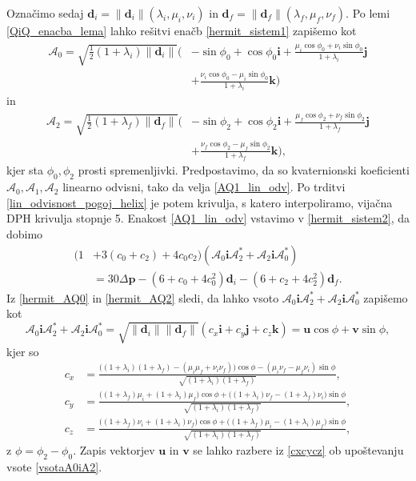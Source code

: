 \documentclass[12pt,a4paper,twoside]{article}
\theoremstyle{definition} %
\theoremstyle{plain} %
\theoremstyle{primerstyle}
\numberwithin{equation}{section}  %
\newcommand{\dV}{\mathbf{d}}
\newcommand{\pV}{\mathbf{p}}
\newcommand{\iV}{\mathbf{i}}
\newcommand{\jV}{\mathbf{j}}
\newcommand{\kV}{\mathbf{k}}
\newcommand{\uV}{\mathbf{u}}
\newcommand{\vV}{\mathbf{v}}
\newcommand{\AQ}{\mathcal{A}}
\begin{document}
Označimo sedaj $\dV_i=\lVert\dV_i\rVert(\lambda_i,\mu_i,\nu_i)$ in $\dV_f=\lVert\dV_f\rVert(\lambda_f,\mu_f,\nu_f).$ Po lemi \ref{QiQ_enacba_lema} lahko rešitvi enačb \eqref{hermit_sistem1} zapišemo kot
\begin{align}
	\label{hermit_AQ0}
	\AQ_0=\sqrt{\frac{1}{2}(1+\lambda_i)\lVert\dV_i\rVert}\Big(&-\sin\phi_0+\cos\phi_0\iV+\frac{\mu_i\cos\phi_0+\nu_i\sin\phi_0}{1+\lambda_i}\jV\nonumber\\
		&+\frac{\nu_i\cos\phi_0-\mu_i\sin\phi_0}{1+\lambda_i}\kV\Big)
\end{align}
in
\begin{align}
	\label{hermit_AQ2}
	\AQ_2=\sqrt{\frac{1}{2}(1+\lambda_f)\lVert\dV_f\rVert}\Big(&-\sin\phi_2+\cos\phi_2\iV+\frac{\mu_f\cos\phi_2+\nu_f\sin\phi_2}{1+\lambda_f}\jV\nonumber\\
		&+\frac{\nu_f\cos\phi_2-\mu_f\sin\phi_2}{1+\lambda_f}\kV\Big),
\end{align}
kjer sta $\phi_0,\phi_2$ prosti spremenljivki. Predpostavimo, da so kvaternionski koeficienti $\AQ_0,\AQ_1,\AQ_2$ linearno odvisni, tako da velja \eqref{AQ1_lin_odv}. Po trditvi \ref{lin_odvisnost_pogoj_helix} je potem krivulja, s katero interpoliramo, vijačna DPH krivulja stopnje 5. Enakost \eqref{AQ1_lin_odv} vstavimo v \eqref{hermit_sistem2}, da dobimo
\begin{align}
	\label{hermit_sistem3}
	(1&+3(c_0+c_2)+4c_0c_2)(\AQ_0\iV\AQ_2^*+\AQ_2\iV\AQ_0^*)\nonumber\\
	&=30\Delta\pV-(6+c_0+4c_0^2)\dV_i-(6+c_2+4c_2^2)\dV_f.
\end{align}
Iz \eqref{hermit_AQ0} in \eqref{hermit_AQ2} sledi, da lahko vsoto $\AQ_0\iV\AQ_2^*+\AQ_2\iV\AQ_0^*$ zapišemo kot
\begin{equation}
	\label{vsotaA0iA2}
	\AQ_0\iV\AQ_2^*+\AQ_2\iV\AQ_0^*=\sqrt{\lVert\dV_i\rVert\lVert\dV_f\rVert}(c_x\iV+c_y\jV+c_z\kV)=\uV\cos\phi+\vV\sin\phi,
\end{equation}
kjer so
\begin{align}
	\label{cxcycz}
	c_x&=\frac{\big((1+\lambda_i)(1+\lambda_f)-(\mu_i\mu_f+\nu_i\nu_f)\big)\cos\phi-(\mu_i\nu_f-\mu_f\nu_i)\sin\phi}{\sqrt{(1+\lambda_i)(1+\lambda_f)}},\nonumber\\
	c_y&=\frac{\big((1+\lambda_f)\mu_i+(1+\lambda_i)\mu_f\big)\cos\phi+\big((1+\lambda_i)\nu_f-(1+\lambda_f)\nu_i\big)\sin\phi}{\sqrt{(1+\lambda_i)(1+\lambda_f)}},\\
	c_z&=\frac{\big((1+\lambda_f)\nu_i+(1+\lambda_i)\nu_f\big)\cos\phi+\big((1+\lambda_f)\mu_i-(1+\lambda_i)\mu_f\big)\sin\phi}{\sqrt{(1+\lambda_i)(1+\lambda_f)}},\nonumber
\end{align}
z $\phi=\phi_2-\phi_0.$ Zapis vektorjev $\uV$ in $\vV$ se lahko razbere iz \eqref{cxcycz} ob upoštevanju vsote \eqref{vsotaA0iA2}.
\end{document}
